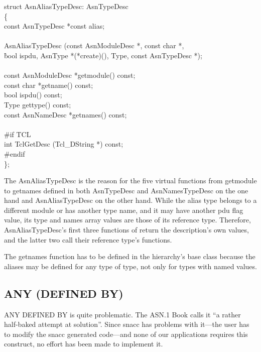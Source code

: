 \begin{Ccode}
struct AsnAliasTypeDesc: AsnTypeDesc\\
\{\+\\
  const AsnTypeDesc		\>\>*const alias;\\
\\
				\>\>AsnAliasTypeDesc (const AsnModuleDesc *, const char *,\\
					\`bool ispdu, AsnType *(*create)(), Type, const AsnTypeDesc *);\\
\\
  const AsnModuleDesc		\>\>*getmodule() const;\\
  const char			\>\>*getname() const;\\
  bool				\>\>ispdu() const;\\
  Type				\>\>gettype() const;\\
  const AsnNameDesc		\>\>*getnames() const;\\
\\
\<\#if TCL\\
  int				\>\>TclGetDesc (Tcl\_DString *) const;\-\\
\#endif\\
\};
\end{Ccode}

The {\C AsnAliasTypeDesc} is the reason for the five virtual functions from {\C getmodule} to {\C getnames} defined in both {\C AsnTypeDesc} and {\C AsnNamesTypeDesc} on the one hand and {\C AsnAliasTypeDesc} on the other hand.
While the alias type belongs to a different module or has another type name, and it may have another {\C pdu} flag value, its type and names array values are those of its reference type.
Therefore, {\C AsnAliasTypeDesc}'s first three functions of return the description's own values, and the latter two call their reference type's functions.

The {\C getnames} function has to be defined in the hierarchy's base class because the aliases may be defined for any type of type, not only for types with named values.

\subsection{\label{meta-any}ANY (DEFINED BY)}

ANY DEFINED BY is quite problematic.
The ASN.1 Book \cite{ASN.1Book} calls it ``a rather half-baked attempt at solution''.
Since snacc has problems with it---the user has to modify the snacc generated code---and none of our applications requires this construct, no effort has been made to implement it.

